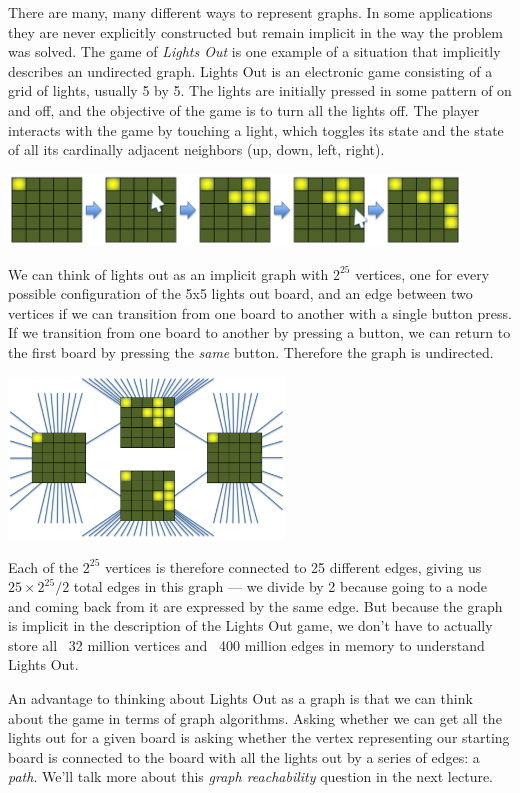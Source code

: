 There are many, many different ways to represent graphs.  In some
applications they are never explicitly constructed but remain implicit
in the way the problem was solved. The game of \emph{Lights Out} is one
example of a situation that implicitly describes an undirected graph.
Lights Out is an electronic game consisting of a grid of lights,
usually 5 by 5. The lights are initially pressed in some pattern of on
and off, and the objective of the game is to turn all the lights off.
The player interacts with the game by touching a light, which toggles
its state and the state of all its cardinally adjacent neighbors (up,
down, left, right).
\begin{center}
  \includegraphics[width=0.9\textwidth]{img/lightsout.png}
\end{center}
We can think of lights out as an implicit graph with $2^{25}$ vertices, one
for every possible configuration of the 5x5 lights out board, and an edge
between two vertices if we can transition from one board to another with a
single button press.  If we transition from one board to another by pressing a
button, we can return to the first board by pressing the \emph{same} button.
Therefore the graph is undirected.
\begin{center}
  \includegraphics[width=0.55\textwidth]{img/lightsout-graph.png}
\end{center}
Each of the $2^{25}$ vertices is therefore connected to 25 different edges,
giving us $25 \times 2^{25} / 2$ total edges in this graph --- we divide by 2
because going to a node and coming back from it are expressed by the same
edge. But because the graph is implicit in the description of the Lights Out
game, we don't have to actually store all ~32 million vertices and ~400
million edges in memory to understand Lights Out.

An advantage to thinking about Lights Out as a graph is that we can
think about the game in terms of graph algorithms.  Asking whether
we can get all the lights out for a given board is asking whether the vertex
representing our starting board is connected to the board with all the
lights out by a series of edges: a \emph{path}. We'll talk more about
this \emph{graph reachability} question in the next lecture.


